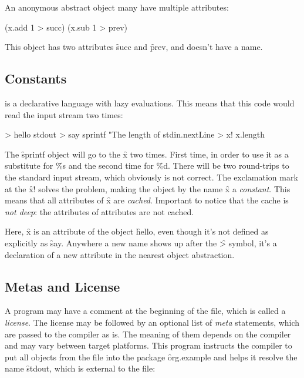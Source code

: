 An anonymous abstract object many have multiple attributes:

\begin{eocode}
[x] (x.add 1 > succ) (x.sub 1 > prev)
\end{eocode}

This object has two attributes \f{succ} and \f{prev}, and doesn't
have a name.

\subsection{Constants}

\eo{} is a declarative language with lazy evaluations. This means
that this code would read the input stream two times:

\begin{eocode}
[] > hello
  stdout > say
    sprintf
      "The length of %
      stdin.nextLine > x!
      x.length
\end{eocode}

The \f{sprintf} object will go to the \f{x} two times. First time,
in order to use it as a substitute for \f{\%s} and the second time for
\f{\%d}. There will be two round-trips to the standard input stream, which
obviously is not correct. The exclamation mark at the \f{x!} solves the
problem, making the object by the name \f{x} a \emph{constant}. This means
that all attributes of \f{x} are \emph{cached}. Important to notice
that the cache is \emph{not deep}: the attributes of attributes are not cached.

Here, \f{x} is an attribute of the object \f{hello}, even though
it's not defined as explicitly as \f{say}. Anywhere a new
name shows up after the \f{>} symbol, it's a declaration of a new
attribute in the nearest object abstraction.

\subsection{Metas and License}

A program may have a comment at the beginning of the file, which
is called a \emph{license}. The license may be followed by an optional
list of \emph{meta} statements, which are passed to the compiler
as is. The meaning of them depends on the compiler and may vary
between target platforms. This program instructs the compiler
to put all objects from the file into the package \f{org.example}
and helps it resolve the name \f{stdout}, which is external
to the file:

